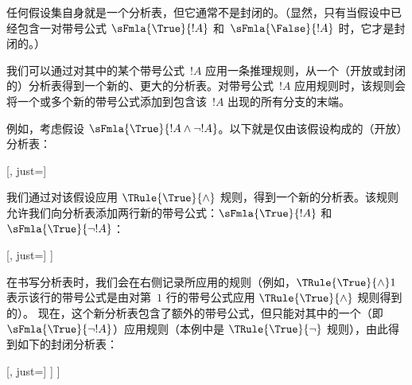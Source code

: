 \documentclass[../../../include/open-logic-section]{subfiles}
\begin{document}
\begin{ex}
  任何假设集自身就是一个分析表，但它通常不是封闭的。（显然，只有当假设中已经包含一对带号公式 $\sFmla{\True}{!A}$ 和~$\sFmla{\False}{!A}$ 时，它才是封闭的。）

  我们可以通过对其中的某个带号公式~$!A$ 应用一条推理规则，从一个（开放或封闭的）分析表得到一个新的、更大的分析表。对带号公式~$!A$ 应用规则时，该规则会将一个或多个新的带号公式添加到包含该~$!A$ 出现的所有分支的末端。

  例如，考虑假设 $\sFmla{\True}{!A \land \lnot
    !A}$。以下就是仅由该假设构成的（开放）分析表：
  \begin{center}
    \begin{tableau}{}
      [, just=\TAss]
    \end{tableau}{}
  \end{center}
  我们通过对该假设应用 $\TRule{\True}{\land}$ 规则，得到一个新的分析表。该规则允许我们向分析表添加两行新的带号公式：$\sFmla{\True}{!A}$ 和 $\sFmla{\True}{\lnot !A}$：
  \begin{center}
    \begin{tableau}{}
      [, just=\TAss
        [\sFmla{\True}{\formula{A}}, just={\TRule{\True}{\land}[1]},
          [\sFmla{\True}{\lnot \formula{A}}, just={\TRule{\True}{\land}[1]}
          ]
        ]
      ]
    \end{tableau}{}
  \end{center}
  在书写分析表时，我们会在右侧记录所应用的规则（例如，$\TRule{\True}{\land} 1$ 表示该行的带号公式是由对第~$1$ 行的带号公式应用 $\TRule{\True}{\land}$ 规则得到的）。
  现在，这个新分析表包含了额外的带号公式，但只能对其中的一个（即 $\sFmla{\True}{\lnot !A}$）应用规则（本例中是 $\TRule{\True}{\lnot}$ 规则），由此得到如下的封闭分析表：
  \begin{center}
    \begin{tableau}{}
      [, just=\TAss
        [\sFmla{\True}{\formula{A}}, just={\TRule{\True}{\land}[1]}
          [\sFmla{\True}{\lnot \formula{A}}, just={\TRule{\True}{\land}[1]}
            [\sFmla{\False}{\formula{A}}, just={\TRule{\True}{\lnot}[3]}, close]
          ]
        ]
      ]
    \end{tableau}{}
  \end{center}
\end{ex}
\end{document}
